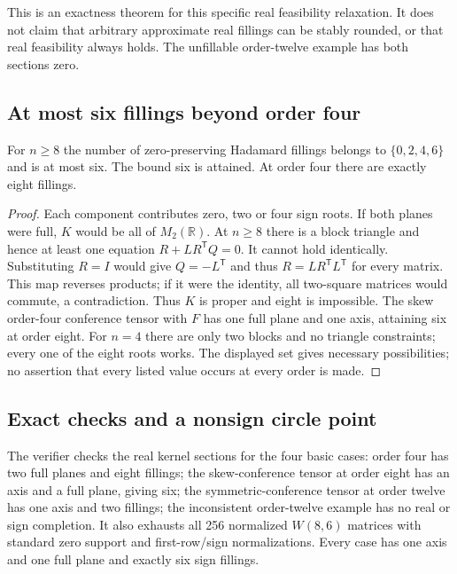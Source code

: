 This is an exactness theorem for this specific real feasibility
relaxation. It does not claim that arbitrary approximate real
fillings can be stably rounded, or that real feasibility always
holds. The unfillable order-twelve example has both sections zero.

\subsection{At most six fillings beyond order four}
\begin{proposition}
For $n\ge8$ the number of zero-preserving Hadamard fillings belongs
to $\{0,2,4,6\}$ and is at most six. The bound six is attained.
At order four there are exactly eight fillings.
\end{proposition}
\begin{proof}
Each component contributes zero, two or four sign roots. If both
planes were full, $K$ would be all of $M_2(\mathbb R)$. At $n\ge8$
there is a block triangle and hence at least one equation
$R+LR^{\mathsf T}Q=0$. It cannot hold identically. Substituting
$R=I$ would give $Q=-L^{\mathsf T}$ and thus
$R=LR^{\mathsf T}L^{\mathsf T}$ for every matrix. This map reverses
products; if it were the identity, all two-square matrices would
commute, a contradiction. Thus $K$ is proper and eight is impossible.
The skew order-four conference tensor with $F$ has one full plane
and one axis, attaining six at order eight. For $n=4$ there are
only two blocks and no triangle constraints; every one of the
eight roots works. The displayed set gives necessary possibilities;
no assertion that every listed value occurs at every order is made.
\end{proof}

\subsection{Exact checks and a nonsign circle point}
The verifier checks the real kernel sections for the four basic
cases: order four has two full planes and eight fillings; the
skew-conference tensor at order eight has an axis and a full plane,
giving six; the symmetric-conference tensor at order twelve has
one axis and two fillings; the inconsistent order-twelve example
has no real or sign completion. It also exhausts all 256 normalized
$W(8,6)$ matrices with standard zero support and first-row/sign
normalizations. Every case has one axis and one full plane and
exactly six sign fillings.

